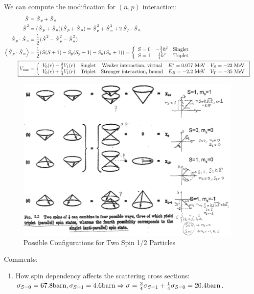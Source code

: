 \documentclass{school-22.101-notes}
\begin{document}
\begin{enumerate}
We can compute the modification for $(n,p)$ interaction:
\begin{align*}
\Shat &= \Shat_p + \Shat_n \\
\Shat^2 &= (\Shat_p + \Shat_n )(\Shat_p + \Shat_n) = \Shat_p^2 + \Shat_n^2 + 2 \Shat_p \cdot \Shat_n \\
\Shat_p \cdot \Shat_n &= \frac{1}{2} (\Shat^2 - \Shat_p^2 - \Shat_n^2) \\
\expect{\Shat_p \cdot \Shat_n}&= \frac{1}{2} (S(S+1) - S_p (S_p+1) - S_n (S_n+1) ) 
= \left\{ \begin{array}{ccc} S=0 & -\frac{3}{4} \hbar^2 & \mbox{Singlet} \\ S=1 & \frac{1}{4} \hbar^2 & \mbox{Triplet} \end{array} \right. \\
\Aboxed{V_{\mathrm{nuc}} &=  {\left\{ \begin{array}{ccccc} 
V_0 (r) - \frac{3}{4} V_1(r)  & \mbox{Singlet}& \mbox{Weaker interaction, virtual} & E^* = 0.077 \fsp \MeV & V_S = -23 \fsp \MeV \\ 
V_0 (r) + \frac{1}{4} V_1(r)  & \mbox{Triplet}& \mbox{Stronger interaction, bound} & E_B = -2.2 \fsp \MeV & V_T = -35 \fsp \MeV
\end{array}\right.} } \\
\end{align*}
\begin{figure}[ht]
    \centering
    \includegraphics[width=5in]{images/deuteron/deuteron-possible-config.png}
    \caption{Possible Configurations for Two Spin 1/2 Particles}
\end{figure}

Comments:
\begin{enumerate}
\item How spin dependency affects the scattering cross sections: $\sigma_{S=0} = 67.8 \mathrm{barn}, \sigma_{S=1} = 4.6 \mathrm{barn} \Rightarrow \sigma = \frac{3}{4} \sigma_{S=1} + \frac{1}{4} \sigma_{S=0} = 20.4 \mathrm{barn}$. 


\end{enumerate}
\end{enumerate}
\end{document}
